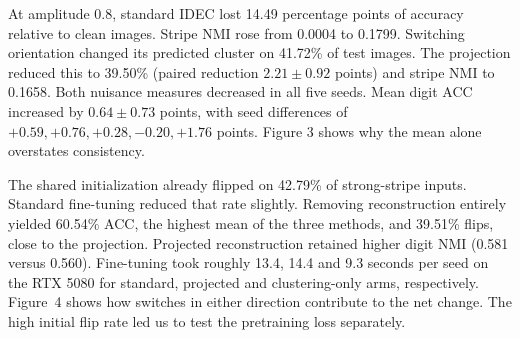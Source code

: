 At amplitude 0.8, standard IDEC lost 14.49 percentage points of accuracy relative to clean images. Stripe NMI rose from 0.0004 to 0.1799. Switching orientation changed its predicted cluster on 41.72\% of test images. The projection reduced this to 39.50\% (paired reduction $2.21\pm0.92$ points) and stripe NMI to 0.1658. Both nuisance measures decreased in all five seeds. Mean digit ACC increased by $0.64\pm0.73$ points, with seed differences of $+0.59,+0.76,+0.28,-0.20,+1.76$ points. Figure 3 shows why the mean alone overstates consistency.

The shared initialization already flipped on 42.79\% of strong-stripe inputs. Standard fine-tuning reduced that rate slightly. Removing reconstruction entirely yielded 60.54\% ACC, the highest mean of the three methods, and 39.51\% flips, close to the projection. Projected reconstruction retained higher digit NMI (0.581 versus 0.560). Fine-tuning took roughly 13.4, 14.4 and 9.3 seconds per seed on the RTX 5080 for standard, projected and clustering-only arms, respectively. Figure~4 shows how switches in either direction contribute to the net change. The high initial flip rate led us to test the pretraining loss separately.
